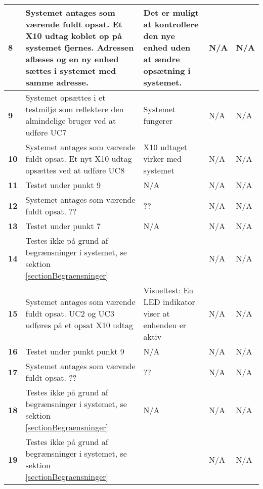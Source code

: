 \begin{center}
\begin{longtable}{|p{}|p{}|p{3cm}|p{3cm}|p{3cm}|}
\textbf{8} &
Systemet antages som værende fuldt opsat.\newline
Et X10 udtag koblet op på systemet fjernes. Adressen aflæses og en ny enhed sættes i systemet med samme adresse.&
Det er muligt at kontrollere den nye enhed uden at ændre opsætning i systemet.&
N/A &
N/A \\\hline

\textbf{9} &
Systemet opsættes i et testmiljø som reflektere den almindelige bruger ved at udføre UC7&
Systemet fungerer&
N/A &
N/A \\\hline

\textbf{10} &
Systemet antages som værende fuldt opsat.\newline
Et nyt X10 udtag opsættes ved at udføre UC8 &
X10 udtaget virker med systemet&
N/A &
N/A \\\hline

\textbf{11} &
Testet under punkt 9&
N/A &
N/A &
N/A \\\hline

\textbf{12} &
Systemet antages som værende fuldt opsat.\newline
??&
??&
N/A &
N/A \\\hline

\textbf{13} &
Testet under punkt 7&
N/A &
N/A &
N/A \\\hline

\textbf{14} &
Testes ikke på grund af begrænsninger i systemet, se sektion \ref{sectionBegraensninger}&
&
N/A &
N/A \\\hline

\textbf{15} &
Systemet antages som værende fuldt opsat.\newline
UC2 og UC3 udføres på et opsat X10 udtag&
Visueltest: En LED indikator viser at enhenden er aktiv&
N/A &
N/A \\\hline

\textbf{16} &
Testet under punkt punkt 9&
N/A &
N/A &
N/A \\\hline

\textbf{17} &
Systemet antages som værende fuldt opsat.\newline
??&
??&
N/A &
N/A \\\hline

\textbf{18} &
Testes ikke på grund af begrænsninger i systemet, se sektion \ref{sectionBegraensninger}&
N/A &
N/A &
N/A \\\hline

\textbf{19} &
Testes ikke på grund af begrænsninger i systemet, se sektion \ref{sectionBegraensninger}&
&
N/A &
N/A \\\hline



	\end{longtable}
	\label{ATUC8} 
\end{center}